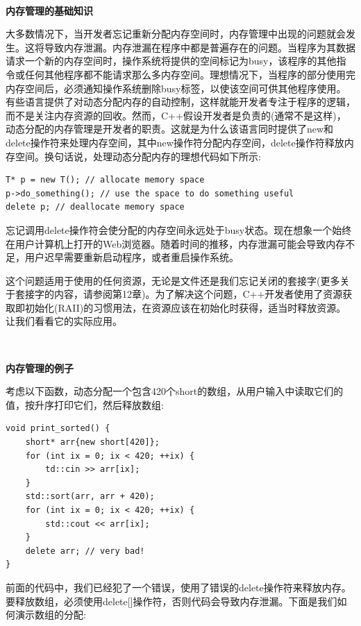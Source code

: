 \noindent\textbf{}\ \par
\textbf{内存管理的基础知识} \ \par
大多数情况下，当开发者忘记重新分配内存空间时，内存管理中出现的问题就会发生。这将导致内存泄漏。内存泄漏在程序中都是普遍存在的问题。当程序为其数据请求一个新的内存空间时，操作系统将提供的空间标记为busy，该程序的其他指令或任何其他程序都不能请求那么多内存空间。理想情况下，当程序的部分使用完内存空间后，必须通知操作系统删除busy标签，以使该空间可供其他程序使用。有些语言提供了对动态分配内存的自动控制，这样就能开发者专注于程序的逻辑，而不是关注内存资源的回收。然而，C++假设开发者是负责的(通常不是这样)，动态分配的内存管理是开发者的职责。这就是为什么该语言同时提供了new和delete操作符来处理内存空间，其中new操作符分配内存空间，delete操作符释放内存空间。换句话说，处理动态分配内存的理想代码如下所示: \par

\begin{lstlisting}[caption={}]
T* p = new T(); // allocate memory space
p->do_something(); // use the space to do something useful
delete p; // deallocate memory space
\end{lstlisting}

忘记调用delete操作符会使分配的内存空间永远处于busy状态。现在想象一个始终在用户计算机上打开的Web浏览器。随着时间的推移，内存泄漏可能会导致内存不足，用户迟早需要重新启动程序，或者重启操作系统。 \par
这个问题适用于使用的任何资源，无论是文件还是我们忘记关闭的套接字(更多关于套接字的内容，请参阅第12章)。为了解决这个问题，C++开发者使用了资源获取即初始化(RAII)的习惯用法，在资源应该在初始化时获得，适当时释放资源。让我们看看它的实际应用。 \par

\noindent\textbf{}\ \par
\textbf{内存管理的例子} \ \par
考虑以下函数，动态分配一个包含420个short的数组，从用户输入中读取它们的值，按升序打印它们，然后释放数组: \par

\begin{lstlisting}[caption={}]
void print_sorted() {
	short* arr{new short[420]};
	for (int ix = 0; ix < 420; ++ix) {
		td::cin >> arr[ix];
	}
	std::sort(arr, arr + 420);
	for (int ix = 0; ix < 420; ++ix) {
		std::cout << arr[ix];
	}
	delete arr; // very bad!
}
\end{lstlisting}

前面的代码中，我们已经犯了一个错误，使用了错误的delete操作符来释放内存。要释放数组，必须使用delete[]操作符，否则代码会导致内存泄漏。下面是我们如何演示数组的分配: \par

